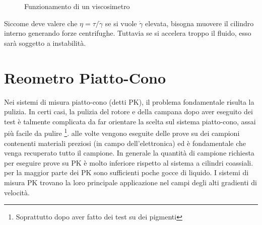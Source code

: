 \begin{figure}
\centering
{}\quad
{}
\caption{Funzionamento di un viscosimetro}
\label{exp:Viscosimetro}
\end{figure}

Siccome deve valere che $\eta = \tau / \dot{\gamma}$ se si vuole $\dot{\gamma}$ elevata, bisogna muovere il cilindro interno generando forze centrifughe.
Tuttavia se si accelera troppo il fluido, esso sarà soggetto a instabilità.

\section{Reometro Piatto-Cono}
Nei sistemi di misura piatto-cono (detti \ac{PK}), il problema fondamentale risulta la pulizia.
In certi casi, la pulizia del rotore e della campana dopo aver eseguito dei test è talmente complicata da far orientare la scelta sul sistema piatto-cono, assai più facile da pulire%
\footnote{Soprattutto dopo aver fatto dei test su dei pigmenti}.
alle volte vengono eseguite delle prove su dei campioni contenenti materiali preziosi (in campo dell'elettronica) ed è fondamentale che venga recuperato tutto il campione.
In generale la quantità di campione richiesta per eseguire prove su \ac{PK} è molto inferiore rispetto al sistema a cilindri coassiali.
per la maggior parte dei \ac{PK} sono sufficienti poche gocce di liquido.
I sistemi di misura \ac{PK} trovano la loro principale applicazione nel campi degli alti gradienti di velocità.

